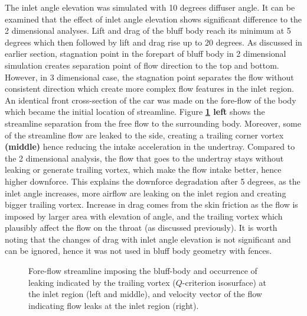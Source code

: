 \noindent The inlet angle elevation was simulated with 10 degrees diffuser angle. It can be examined that the effect of inlet angle elevation shows significant difference to the 2 dimensional analyses. Lift and drag of the bluff body reach its minimum at 5 degrees which then followed by lift and drag rise up to 20 degrees. As discussed in earlier section, stagnation point in the forepart of bluff body in 2 dimensional simulation creates separation point of flow direction to the top and bottom. However, in 3 dimensional case, the stagnation point separates the flow without consistent direction which create more complex flow features in the inlet region. An identical front cross-section of the car was made on the fore-flow of the body which became the initial location of streamline. Figure \textbf{\ref{fig:3D_OF_INLET_COMPARE} left} shows the streamline separation from the free flow to the surrounding body. Moreover, some of the streamline flow are leaked to the side, creating a trailing corner vortex \textbf{(middle)} hence reducing the intake acceleration in the undertray.  Compared to the 2 dimensional analysis, the flow that goes to the undertray stays without leaking or generate trailing vortex, which make the flow intake better, hence higher downforce. This explains the downforce degradation after 5 degrees, as the inlet angle increases, more airflow are leaking on the inlet region and creating bigger trailing vortex. Increase in drag comes from the skin friction as the flow is imposed by larger area with elevation of angle, and the trailing vortex which plausibly affect the flow on the throat (as discussed previously). It is worth noting that the changes of drag with inlet angle elevation is not significant and can be ignored, hence it was not used in  bluff body geometry with fences.

\begin{figure}[!htb]
    \centering
    \noindent{}
    \caption{Fore-flow streamline imposing the bluff-body and occurrence of leaking indicated by the trailing vortex ($Q$-criterion isosurface) at the inlet region (left and middle), and velocity vector of the flow indicating flow leaks at the inlet region (right).} 
    \label{fig:3D_OF_INLET_COMPARE}
\end{figure}

